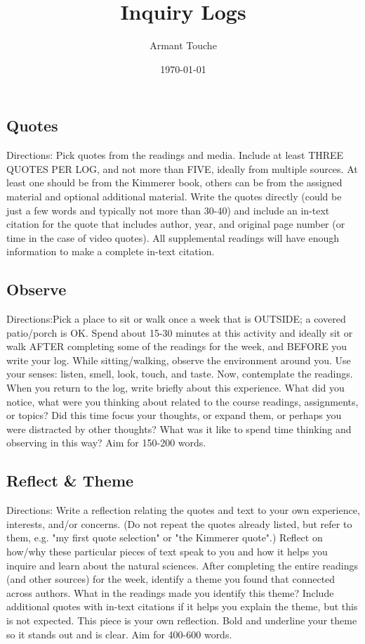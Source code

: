 \documentclass[12pt,a4paper,man,natbib]{apa6}
\title{Inquiry Logs}
\author{Armant Touche}
\affiliation{Portland State University}
\date{\today}
\begin{document}
\maketitle

\subsection{Quotes}

Directions: Pick quotes from the readings and media. Include at least THREE QUOTES PER LOG, and not more than FIVE, ideally from multiple sources. At least one should be from the Kimmerer book, others can be from the assigned material and optional additional material.  Write the quotes directly (could be just a few words and typically not more than 30-40) and include an in-text citation for the quote that includes author, year, and original page number (or time in the case of video quotes).  All supplemental readings will have enough information to make a complete in-text citation.

\subsection{Observe}

Directions:Pick a place to sit or walk once a week that is OUTSIDE; a covered patio/porch is OK.  Spend about 15-30 minutes at this activity and ideally sit or walk AFTER completing some of the readings for the week, and BEFORE you write your log.  While sitting/walking, observe the environment around you.  Use your senses: listen, smell, look, touch, and taste. Now, contemplate the readings. When you return to the log, write briefly about this experience. What did you notice, what were you thinking about related to the course readings, assignments, or topics?  Did this time focus your thoughts, or expand them, or perhaps you were distracted by other thoughts? What was it like to spend time thinking and observing in this way?  Aim for 150-200 words.

\subsection{Reflect \& Theme}

Directions: Write a reflection relating the quotes and text to your own experience, interests, and/or concerns. (Do not repeat the quotes already listed, but refer to them, e.g. "my first quote selection" or "the Kimmerer quote".) Reflect on how/why these particular pieces of text speak to you and how it helps you inquire and learn about the natural sciences. After completing the entire readings (and other sources) for the week, identify a theme you found that connected across authors.  What in the readings made you identify this theme?  Include additional quotes with in-text citations if it helps you explain the theme, but this is not expected. This piece is your own reflection.  Bold and underline your theme so it stands out and is clear.  Aim for 400-600 words.
\end{document}

